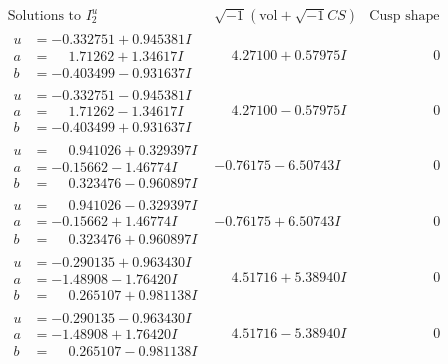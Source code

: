 \documentclass[1p]{elsarticle_modified}
\theoremstyle{definition}
\newcommand{\I}{\sqrt{-1}}
\begin{document}
$$\begin{array}{c|c|c}  
\text{Solutions to }I^u_{2}& \I (\text{vol} + \sqrt{-1}CS) & \text{Cusp shape}\\
 \hline 
\begin{aligned}
u &= -0.332751 + 0.945381 I \\
a &= \phantom{-}1.71262 + 1.34617 I \\
b &= -0.403499 - 0.931637 I\end{aligned}
 & \phantom{-}4.27100 + 0.57975 I & \phantom{-0.000000 } 0 \\ \hline\begin{aligned}
u &= -0.332751 - 0.945381 I \\
a &= \phantom{-}1.71262 - 1.34617 I \\
b &= -0.403499 + 0.931637 I\end{aligned}
 & \phantom{-}4.27100 - 0.57975 I & \phantom{-0.000000 } 0 \\ \hline\begin{aligned}
u &= \phantom{-}0.941026 + 0.329397 I \\
a &= -0.15662 - 1.46774 I \\
b &= \phantom{-}0.323476 - 0.960897 I\end{aligned}
 & -0.76175 - 6.50743 I & \phantom{-0.000000 } 0 \\ \hline\begin{aligned}
u &= \phantom{-}0.941026 - 0.329397 I \\
a &= -0.15662 + 1.46774 I \\
b &= \phantom{-}0.323476 + 0.960897 I\end{aligned}
 & -0.76175 + 6.50743 I & \phantom{-0.000000 } 0 \\ \hline\begin{aligned}
u &= -0.290135 + 0.963430 I \\
a &= -1.48908 - 1.76420 I \\
b &= \phantom{-}0.265107 + 0.981138 I\end{aligned}
 & \phantom{-}4.51716 + 5.38940 I & \phantom{-0.000000 } 0 \\ \hline\begin{aligned}
u &= -0.290135 - 0.963430 I \\
a &= -1.48908 + 1.76420 I \\
b &= \phantom{-}0.265107 - 0.981138 I\end{aligned}
 & \phantom{-}4.51716 - 5.38940 I & \phantom{-0.000000 } 0 \\ \hline\begin{aligned}

\end{aligned}
\end{array}$$
\end{document}
